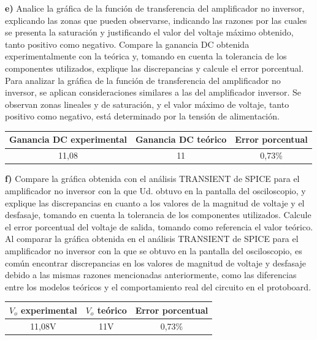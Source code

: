 \documentclass[12pt]{article}
\begin{document}
	\noindent \textbf{e)} Analice la gráfica de la función de transferencia del amplificador no inversor, explicando las zonas que pueden observarse, indicando las razones por las cuales se presenta la saturación y justificando el valor del voltaje máximo obtenido, tanto positivo como negativo. Compare la ganancia DC obtenida experimentalmente con la teórica y, tomando en cuenta la tolerancia de los componentes utilizados, explique las discrepancias y calcule el error porcentual.\\
	
	Para analizar la gráfica de la función de transferencia del amplificador no inversor, se aplican consideraciones similares a las del amplificador inversor. Se observan zonas lineales y de saturación, y el valor máximo de voltaje, tanto positivo como negativo, está determinado por la tensión de alimentación.\\
	
	\begin{center}
		\begin{tabular}{|c|c|c|}
			\hline
			Ganancia DC experimental & Ganancia DC teórico & Error porcentual \\
			\hline
			11,08 & 11 & 0,73\% \\
			\hline
		\end{tabular}
	\end{center}
	
	\noindent \textbf{f)} Compare la gráfica obtenida con el análisis TRANSIENT de SPICE para el amplificador no inversor con la que Ud. obtuvo en la pantalla del osciloscopio, y explique las discrepancias en cuanto a los valores de la magnitud de voltaje y el desfasaje, tomando en cuenta la tolerancia de los componentes utilizados. Calcule el error porcentual del voltaje de salida, tomando como referencia el valor teórico.\\
	
	Al comparar la gráfica obtenida en el análisis TRANSIENT de SPICE para el amplificador no inversor con la que se obtuvo en la pantalla del osciloscopio, es común encontrar discrepancias en los valores de magnitud de voltaje y desfasaje debido a las mismas razones mencionadas anteriormente, como las diferencias entre los modelos teóricos y el comportamiento real del circuito en el protoboard.\\
	
	\begin{center}
		\begin{tabular}{|c|c|c|}
			\hline
			$V_{o}$ experimental & $V_{o}$ teórico & Error porcentual \\
			\hline
			11,08V & 11V & 0,73\% \\
			\hline
		\end{tabular}
	\end{center}
	
\end{document}
